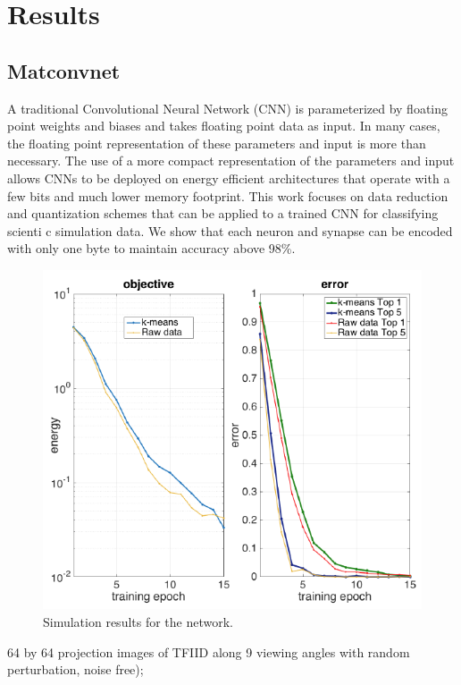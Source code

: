 \section{Results}

\subsection{Matconvnet}
A traditional Convolutional Neural Network (CNN) is parameterized by floating point weights and biases
and takes floating point data as input. In many cases, the floating point representation of these
parameters and input is more than necessary. The use of a more compact representation of the
parameters and input allows CNNs to be deployed on energy efficient architectures that operate with a
few bits and much lower memory footprint. This work focuses on data reduction and quantization schemes
that can be applied to a trained CNN for classifying scienti c simulation data. We show that each
neuron and synapse can be encoded with only one byte to maintain accuracy above 98\%.
\begin{figure}[h]
\centering
\includegraphics[width=\linewidth]{img/joao3.png}
\caption{Simulation results for the network.}
\label{fig_sim}
\end{figure}


64 by 64 projection images of TFIID along 9 viewing angles with random perturbation, noise free);

